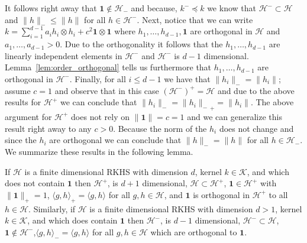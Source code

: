 \documentclass[AHL,Unicode,longabstracts,published]{cedram}
\theoremstyle{remark}
\newcommand{\cH}{\mathcal{H}}
\newcommand{\clK}{\mathcal{K}}
\begin{document}
It follows right away that $\bm 1 \not \in \cH_-$ and because, $k^- \preceq k$ we know that $\cH^- \subset \cH$ and $\|h\|_- \leq \|h\|$ for all $h\in \cH^-$. Next, notice that we can write $k = \sum_{i=1}^{d-1} a_i h_i \otimes h_i + c^2 \bm 1 \otimes \bm 1$ where $h_1,\dots, h_{d-1}, \bm 1$ are orthogonal in $\cH$ and $a_1, \dots, a_{d-1} >0$. Due to the orthogonality it follows that the $h_1,\dots, h_{d-1}$ are linearly independent elements in $\cH^-$ and $\cH^-$ is $d-1$ dimensional. Lemma~\ref{lem:order_orthogonal} tells us furthermore that $h_1,\dots, h_{d-1}$ are orthogonal in $\cH^-$. Finally, for all $i\leq d-1$ we have that $\|h_i\|_- = \|h_i\|$; assume $c=1$ and observe that in this case $(\cH^-)^+ = \cH$ and due to the above results for $\cH^+$ we can conclude that $\|h_i\|_- = {\|h_i\|_-}_+ = \|h_i\|$. The above argument for $\cH^+$ does not rely on $\|\bm 1\| = c= 1$ and we can generalize this result right away to any $c >0$. Because the norm of the $h_i$ does not change and since the $h_i$ are orthogonal we can conclude that $\|h\|_- = \|h\|$ for all $h\in \cH_-$. We summarize these results in the following lemma.

\begin{lemm}\label{lem:approx_error_sup_finite}
If $\cH$ is a finite dimensional RKHS with dimension $d$, kernel $k \in \clK$, and which does not contain $\bm 1$ then $\cH^+$, is $d+1$ dimensional, $\cH \subset \cH^+$, $\bm 1 \in \cH^+$ with $\|\bm 1\|_+ = 1$, $\langle g,h \rangle_+ = \langle g,h \rangle$ for all $g,h \in \cH$, and $\bm 1$ is orthogonal in $\cH^+$ to all $h\in \cH$. Similarly, if $\cH$ is a finite dimensional RKHS with dimension $d > 1$, kernel $k\in \clK$, and which does contain $\bm 1$ then $\cH^-$, is $d-1$ dimensional, $\cH^- \subset \cH$, $\bm 1 \not \in \cH^-$,$\langle g,h \rangle_- = \langle g,h \rangle$ for all $g,h \in \cH$ which are orthogonal to $\bm 1$.
\end{lemm}
\end{document}
